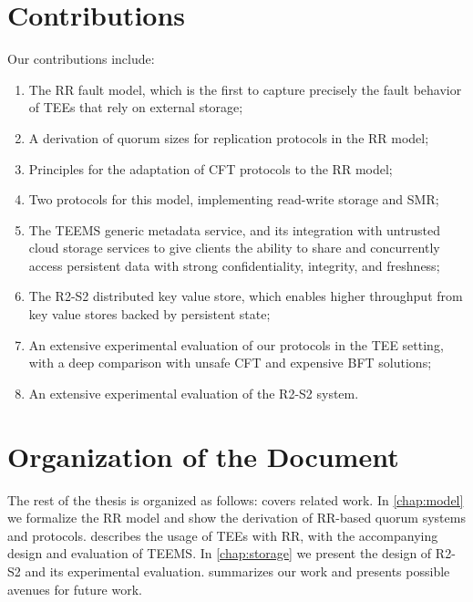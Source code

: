 \section{Contributions}

Our contributions include:
\begin{enumerate}
    \item The \ac{RR} fault model, which is the first to capture
        precisely the fault behavior of \acp{TEE} that rely on external storage;
    \item A derivation of quorum sizes for replication protocols
        in the \ac{RR} model;
    \item Principles for the adaptation of \ac{CFT} protocols to
        the \ac{RR} model;
    \item Two protocols for this model, implementing read-write
        storage and \ac{SMR};
    \item The \ac{TEEMS} generic metadata service, and its integration with
        untrusted cloud storage services to give clients the ability to share
        and concurrently access persistent data with strong confidentiality,
        integrity, and freshness;
    \item The \ac{R2-S2} distributed key value store, which
        enables higher throughput from key value stores backed by
        persistent state;
    \item An extensive experimental evaluation of our protocols
        in the \ac{TEE} setting, with a deep comparison with
        unsafe \ac{CFT} and expensive \ac{BFT} solutions;
    \item An extensive experimental evaluation of the \ac{R2-S2}
        system.
\end{enumerate}


\section{Organization of the Document}

The rest of the thesis is organized as follows:
 covers related work. In \cref{chap:model} we
formalize the \ac{RR} model and show the derivation of
\ac{RR}-based quorum systems and protocols. 
describes the usage of \acp{TEE} with \ac{RR}, with the
accompanying design and evaluation of \ac{TEEMS}. In
\cref{chap:storage} we present the design of
\ac{R2-S2} and its experimental evaluation.
 summarizes our work and presents possible
avenues for future work.

